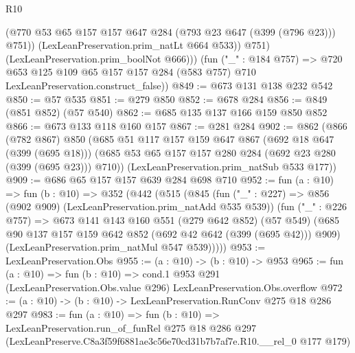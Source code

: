 \begin{lexlean}{R10}
\begin{coremodule}
                (@770 @53 @65 @157 @157 @647 @284 (@793 @23 @647 (@399 (@796 @23))) @751))
              (LexLeanPreservation.prim_natLt @664 @533))
            @751)
          (LexLeanPreservation.prim_boolNot @666)))
      (fun ("_" : @184 @757) =>
      @720 @653 @125 @109 @65 @157 @157 @284 (@583 @757) @710 LexLeanPreservation.construct_false))
@849 := @673 @131 @138 @232 @542
@850 := @57 @535
@851 := @279 @850
@852 := @678 @284
@856 := @849 (@851 @852) (@57 @540)
@862 := @685 @135 @137 @166 @159 @850 @852
@866 := @673 @133 @118 @160 @157
@867 := @281 @284
@902 := @862
    (@866
      (@782 @867)
      @850
      (@685
        @51
        @117
        @157
        @159
        @647
        @867
        (@692 @18 @647 (@399 (@695 @18)))
        (@685 @53 @65 @157 @157 @280 @284 (@692 @23 @280 (@399 (@695 @23))) @710))
      (LexLeanPreservation.prim_natSub @533 @177))
@909 := @686 @65 @157 @157 @639 @284 @698 @710
@952 := fun (a : @10) =>
  fun (b : @10) =>
  @352
    (@442
      (@515
        (@845
          (fun ("_" : @227) => @856 (@902 @909) (LexLeanPreservation.prim_natAdd @535 @539))
          (fun ("_" : @226 @757) =>
          @673
            @141
            @143
            @160
            @551
            (@279 @642 @852)
            (@57 @549)
            (@685 @90 @137 @157 @159 @642 @852 (@692 @42 @642 (@399 (@695 @42))) @909)
            (LexLeanPreservation.prim_natMul @547 @539)))))
@953 := LexLeanPreservation.Obs
@955 := (a : @10) -> (b : @10) -> @953
@965 := fun (a : @10) =>
  fun (b : @10) =>
  cond.{1} @953 @291 (LexLeanPreservation.Obs.value @296) LexLeanPreservation.Obs.overflow
@972 := (a : @10) -> (b : @10) -> LexLeanPreservation.RunConv @275 @18 @286 @297
@983 := fun (a : @10) =>
  fun (b : @10) =>
  LexLeanPreservation.run_of_funRel
    @275
    @18
    @286
    @297
    (LexLeanPreserve.C8a3f59f6881ae3c56e70cd31b7b7af7e.R10.__rel_0 @177 @179)
\end{coremodule}
\end{lexlean}
